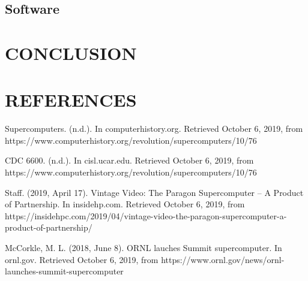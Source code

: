 \documentclass[letterpaper, 10 pt, conference]{IEEEconf}
\begin{document}
\subsection{Software}


\section{CONCLUSION}


\section*{REFERENCES}

\begin{enumerate}[label={[\arabic*]}]
\item Supercomputers. (n.d.). In computerhistory.org. Retrieved October 6, 2019, from https://www.computerhistory.org/revolution/supercomputers/10/76
\item CDC 6600. (n.d.). In cisl.ucar.edu. Retrieved October 6, 2019, from https://www.computerhistory.org/revolution/supercomputers/10/76
\item Staff. (2019, April 17). Vintage Video: The Paragon Supercomputer – A Product of Partnership. In insidehp.com. Retrieved October 6, 2019, from https://insidehpc.com/2019/04/vintage-video-the-paragon-supercomputer-a-product-of-partnership/
\item McCorkle, M. L. (2018, June 8). ORNL lauches Summit supercomputer. In ornl.gov. Retrieved October 6, 2019, from https://www.ornl.gov/news/ornl-launches-summit-supercomputer
\end{enumerate}
\end{document}

